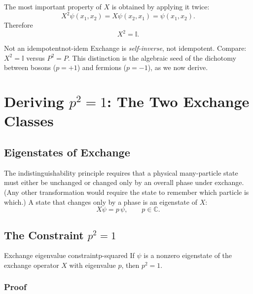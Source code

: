 \documentclass[11pt,a4paper]{article}
\newcommand{\id}{\mathbb{I}}
\newcommand{\C}{\mathbb{C}}
\begin{document}
The most important property of $X$ is obtained by applying it twice:
\[
  X^2\psi(x_1,x_2) = X\psi(x_2,x_1) = \psi(x_1,x_2).
\]
Therefore
\[
  X^2 = \id.
\]

\begin{rem}{Not an idempotent}{not-idem}
  Exchange is \emph{self-inverse}, not idempotent.  Compare: $X^2 = \id$
  versus $P^2 = P$.  This distinction is the algebraic seed of the dichotomy
  between bosons ($p=+1$) and fermions ($p=-1$), as we now derive.
\end{rem}

\section{Deriving \texorpdfstring{$p^2=1$}{p² = 1}: The Two Exchange Classes}

\subsection{Eigenstates of Exchange}

The indistinguishability principle requires that a physical many-particle state
must either be unchanged or changed only by an overall phase under exchange.
(Any other transformation would require the state to remember which particle is
which.)  A state that changes only by a phase is an eigenstate of $X$:
\[
  X\psi = p\,\psi, \qquad p \in \C.
\]

\subsection{The Constraint \texorpdfstring{$p^2=1$}{p² = 1}}

\begin{thm}{Exchange eigenvalue constraint}{p-squared}
  If $\psi$ is a nonzero eigenstate of the exchange operator $X$ with
  eigenvalue $p$, then $p^2 = 1$.
\end{thm}

\subsubsection{Proof}
\end{document}
